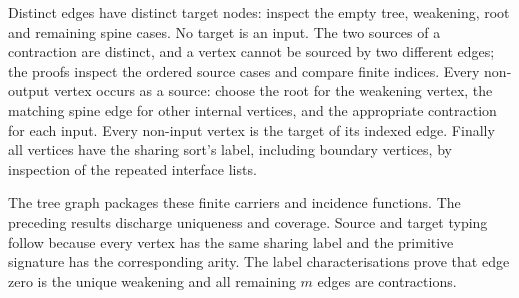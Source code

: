 



Distinct edges have distinct target nodes: inspect the empty tree, weakening,
root and remaining spine cases. No target is an input. The two sources of a
contraction are distinct, and a vertex cannot be sourced by two different
edges; the proofs inspect the ordered source cases and compare finite indices.
Every non-output vertex occurs as a source: choose the root for the weakening
vertex, the matching spine edge for other internal vertices, and the appropriate
contraction for each input. Every non-input vertex is the target of its indexed
edge. Finally all vertices have the sharing sort's label, including boundary
vertices, by inspection of the repeated interface lists.








The tree graph packages these finite carriers and incidence functions. The
preceding results discharge uniqueness and coverage. Source and target typing
follow because every vertex has the same sharing label and the primitive
signature has the corresponding arity. The label characterisations prove
that edge zero is the unique weakening and all remaining $m$ edges are
contractions.




